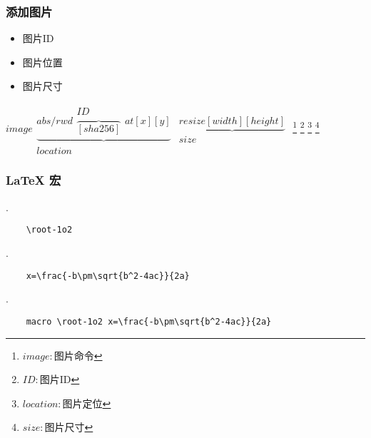 \subsubsection{添加图片}
\begin{itemize}
    \item 图片ID
    \item 图片位置
    \item 图片尺寸
\end{itemize}
\begin{math}
    image
    \begin{matrix}
        \underbrace{
            abs/rwd \begin{matrix}
                        ID \\ \overbrace{[sha256]}
                    \end{matrix} at [x] [y]
        } \\ location
    \end{matrix}
    \begin{matrix}
        \underbrace{resize [width] [height]} \\ size
    \end{matrix}
\end{math}
\footnote{$image: $图片命令}
\footnote{$ID: $图片ID}
\footnote{$location: $图片定位}
\footnote{$size: $图片尺寸}

\subsubsection{\LaTeX
    宏}
.\\
\begin{lstlisting}
    \root-1o2
\end{lstlisting}
.\\
\begin{lstlisting}
    x=\frac{-b\pm\sqrt{b^2-4ac}}{2a}
\end{lstlisting}
.\\
\begin{lstlisting}
    macro \root-1o2 x=\frac{-b\pm\sqrt{b^2-4ac}}{2a}
\end{lstlisting}
